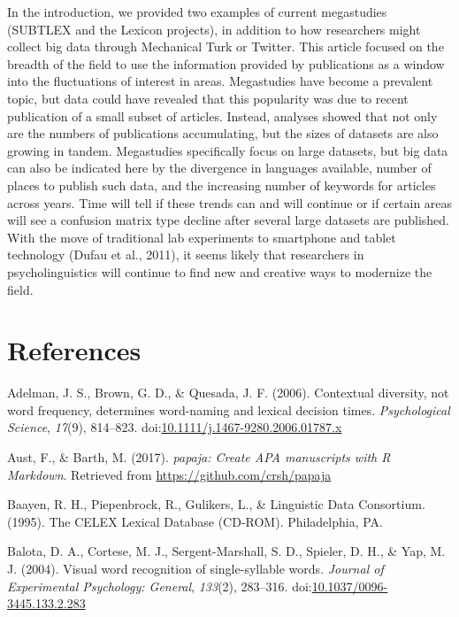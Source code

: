\documentclass[english,man]{apa6}
\theoremstyle{definition}
\theoremstyle{definition}
\theoremstyle{definition}
\theoremstyle{remark}
\begin{document}
In the introduction, we provided two examples of current megastudies
(SUBTLEX and the Lexicon projects), in addition to how researchers might
collect big data through Mechanical Turk or Twitter. This article
focused on the breadth of the field to use the information provided by
publications as a window into the fluctuations of interest in areas.
Megastudies have become a prevalent topic, but data could have revealed
that this popularity was due to recent publication of a small subset of
articles. Instead, analyses showed that not only are the numbers of
publications accumulating, but the sizes of datasets are also growing in
tandem. Megastudies specifically focus on large datasets, but big data
can also be indicated here by the divergence in languages available,
number of places to publish such data, and the increasing number of
keywords for articles across years. Time will tell if these trends can
and will continue or if certain areas will see a confusion matrix type
decline after several large datasets are published. With the move of
traditional lab experiments to smartphone and tablet technology (Dufau
et al., 2011), it seems likely that researchers in psycholinguistics
will continue to find new and creative ways to modernize the field.

\newpage

\section{References}\label{references}

\setlength{\parindent}{-0.5in} \setlength{\leftskip}{0.5in}

\hypertarget{refs}{}
\hypertarget{ref-Adelman2006}{}
Adelman, J. S., Brown, G. D., \& Quesada, J. F. (2006). Contextual
diversity, not word frequency, determines word-naming and lexical
decision times. \emph{Psychological Science}, \emph{17}(9), 814--823.
doi:\href{https://doi.org/10.1111/j.1467-9280.2006.01787.x}{10.1111/j.1467-9280.2006.01787.x}

\hypertarget{ref-R-papaja}{}
Aust, F., \& Barth, M. (2017). \emph{papaja: Create APA manuscripts with
R Markdown}. Retrieved from \url{https://github.com/crsh/papaja}

\hypertarget{ref-Baayen}{}
Baayen, R. H., Piepenbrock, R., Gulikers, L., \& Linguistic Data
Consortium. (1995). The CELEX Lexical Database (CD-ROM). Philadelphia,
PA.

\hypertarget{ref-Balota2004}{}
Balota, D. A., Cortese, M. J., Sergent-Marshall, S. D., Spieler, D. H.,
\& Yap, M. J. (2004). Visual word recognition of single-syllable words.
\emph{Journal of Experimental Psychology: General}, \emph{133}(2),
283--316.
doi:\href{https://doi.org/10.1037/0096-3445.133.2.283}{10.1037/0096-3445.133.2.283}
\end{document}
